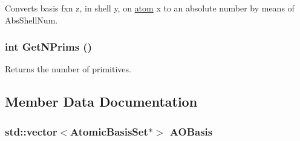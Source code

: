 Converts basis fxn z, in shell y, on \hyperlink{classJKBuilder_1_1atom}{atom} x to an absolute number by means of AbsShellNum. \hypertarget{classJKBuilder_1_1BasisSet_abc886cd4e35d3c56a0250b7d06986f61}{
\subsubsection[{GetNPrims}]{\setlength{\rightskip}{0pt plus 5cm}int GetNPrims ()}}
\label{classJKBuilder_1_1BasisSet_abc886cd4e35d3c56a0250b7d06986f61}


Returns the number of primitives. 

\subsection{Member Data Documentation}
\hypertarget{classJKBuilder_1_1AOBasisSet_a872dee545656a5acc39da552c8e5137f}{
\subsubsection[{AOBasis}]{\setlength{\rightskip}{0pt plus 5cm}std::vector$<${\bf AtomicBasisSet}$\ast$$>$ {\bf AOBasis}}}
\label{classJKBuilder_1_1AOBasisSet_a872dee545656a5acc39da552c8e5137f}


